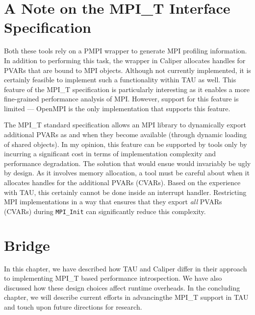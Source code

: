 \section{A Note on the MPI\_T Interface Specification}
\par Both these tools rely on a PMPI wrapper to generate MPI profiling information. In addition to performing this task, the wrapper in Caliper allocates handles for PVARs that are bound to MPI objects. Although not currently implemented, it is certainly feasible to implement such a functionality within TAU as well. This feature of the MPI\_T specification is particularly interesting as it enables a more fine-grained performance analysis of MPI. However, support for this feature is limited --- OpenMPI is the only implementation that supports this feature. 
\par The MPI\_T standard specification allows an MPI library to dynamically export additional PVARs as and when they become available (through dynamic loading of shared objects). In my opinion, this feature can be supported by tools only by incurring a significant cost in terms of implementation complexity and performance degradation. The solution that would ensue would invariably be ugly by design. As it involves memory allocation, a tool must be careful about when it allocates handles for the additional PVARs (CVARs). Based on the experience with TAU, this certainly cannot be done inside an interrupt handler. Restricting MPI implementations in a way that ensures that they export \textit{all} PVARs (CVARs) during \verb+MPI_Init+ can significantly reduce this complexity. 
\section{Bridge}
In this chapter, we have described how TAU and Caliper differ in their approach to implementing MPI\_T based performance introspection. We have also discussed how these design choices affect runtime overheads. In the concluding chapter, we will describe current efforts in advancingthe MPI\_T support in TAU and touch upon future directions for research.
